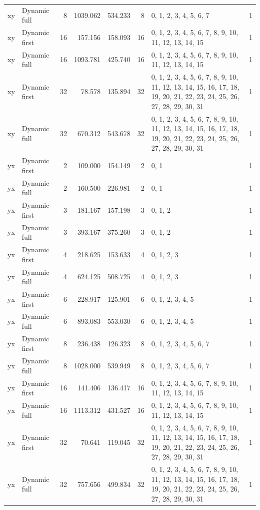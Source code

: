 \documentclass[10pt,a4paper]{article}
\begin{document}
\begin{longtable}{@{}p{23mm}p{29mm}rrrrp{36mm}r@{}}
xy & Dynamic full & 8 & 1039.062 & 534.233 & 8 & 0, 1, 2, 3, 4, 5, 6, 7 & 1 \\
xy & Dynamic first & 16 & 157.156 & 158.093 & 16 & 0, 1, 2, 3, 4, 5, 6, 7, 8, 9, 10, 11, 12, 13, 14, 15 & 1 \\
xy & Dynamic full & 16 & 1093.781 & 425.740 & 16 & 0, 1, 2, 3, 4, 5, 6, 7, 8, 9, 10, 11, 12, 13, 14, 15 & 1 \\
xy & Dynamic first & 32 & 78.578 & 135.894 & 32 & 0, 1, 2, 3, 4, 5, 6, 7, 8, 9, 10, 11, 12, 13, 14, 15, 16, 17, 18, 19, 20, 21, 22, 23, 24, 25, 26, 27, 28, 29, 30, 31 & 1 \\
xy & Dynamic full & 32 & 670.312 & 543.678 & 32 & 0, 1, 2, 3, 4, 5, 6, 7, 8, 9, 10, 11, 12, 13, 14, 15, 16, 17, 18, 19, 20, 21, 22, 23, 24, 25, 26, 27, 28, 29, 30, 31 & 1 \\
yx & Dynamic first & 2 & 109.000 & 154.149 & 2 & 0, 1 & 1 \\
yx & Dynamic full & 2 & 160.500 & 226.981 & 2 & 0, 1 & 1 \\
yx & Dynamic first & 3 & 181.167 & 157.198 & 3 & 0, 1, 2 & 1 \\
yx & Dynamic full & 3 & 393.167 & 375.260 & 3 & 0, 1, 2 & 1 \\
yx & Dynamic first & 4 & 218.625 & 153.633 & 4 & 0, 1, 2, 3 & 1 \\
yx & Dynamic full & 4 & 624.125 & 508.725 & 4 & 0, 1, 2, 3 & 1 \\
yx & Dynamic first & 6 & 228.917 & 125.901 & 6 & 0, 1, 2, 3, 4, 5 & 1 \\
yx & Dynamic full & 6 & 893.083 & 553.030 & 6 & 0, 1, 2, 3, 4, 5 & 1 \\
yx & Dynamic first & 8 & 236.438 & 126.323 & 8 & 0, 1, 2, 3, 4, 5, 6, 7 & 1 \\
yx & Dynamic full & 8 & 1028.000 & 539.949 & 8 & 0, 1, 2, 3, 4, 5, 6, 7 & 1 \\
yx & Dynamic first & 16 & 141.406 & 136.417 & 16 & 0, 1, 2, 3, 4, 5, 6, 7, 8, 9, 10, 11, 12, 13, 14, 15 & 1 \\
yx & Dynamic full & 16 & 1113.312 & 431.527 & 16 & 0, 1, 2, 3, 4, 5, 6, 7, 8, 9, 10, 11, 12, 13, 14, 15 & 1 \\
yx & Dynamic first & 32 & 70.641 & 119.045 & 32 & 0, 1, 2, 3, 4, 5, 6, 7, 8, 9, 10, 11, 12, 13, 14, 15, 16, 17, 18, 19, 20, 21, 22, 23, 24, 25, 26, 27, 28, 29, 30, 31 & 1 \\
yx & Dynamic full & 32 & 757.656 & 499.834 & 32 & 0, 1, 2, 3, 4, 5, 6, 7, 8, 9, 10, 11, 12, 13, 14, 15, 16, 17, 18, 19, 20, 21, 22, 23, 24, 25, 26, 27, 28, 29, 30, 31 & 1 \\
\end{longtable}\normalsize\setlength{\tabcolsep}{6pt}
\clearpage
\end{document}
